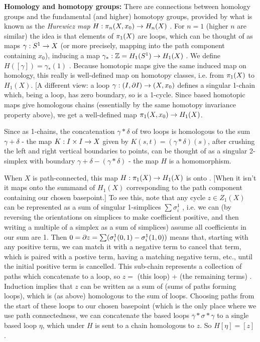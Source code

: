 {\bf Homology and homotopy groups:} There are connections between homology groups and
the fundamental (and higher) homotopy groups, provided by what is known as the
{\it Hurewicz map} $H:\pi_n(X,x_0)\rightarrow H_n(X)$ . For $n=1$ (higher $n$ are similar)
the idea is that elements of $\pi_1(X)$ are loops, which can be thought of as maps
$\gamma:S^1\rightarrow X$ (or more precisely, mapping into the path component containing 
$x_0$), inducing a map $\gamma_*:{\Bbb Z} = H_1(S^1)\rightarrow H_1(X)$ . 
We define $H([\gamma])=\gamma_*(1)$ . Because homotopic maps give the same induced
map on homology, this really is well-defined map on homotopy
classes, i.e. from $\pi_1(X)$ to $H_1(X)$. [A different view: 
a loop $\gamma:(I,\partial I)\rightarrow (X,x_0)$ defines a singular 1-chain which, being a loop,
has zero boundary, so is a 1-cycle. Since based homotopic maps give homologous
chains (essentially by the same homotopy invariance property above), we get a 
well-defined map $\pi_1(X,x_0)\rightarrow H_1(X)$.

Since as 1-chains, the concatenation $\gamma*\delta$ of two loops is homologous
to the sum $\gamma+\delta$ - the map $K:I\times I\rightarrow X$ given by $K(s,t)=(\gamma*\delta)(s)$,
after crushing the left and right vertical boundaries to points, can be thought of as
a singular 2-simplex with boundary $\gamma + \delta - (\gamma*\delta)$ - the map 
$H$ is a homomorphism.

\vfill
\eject

When $X$ is path-connected, this map $H:\pi_1(X)\rightarrow H_1(X)$ is onto . [When it isn't it maps onto the 
summand of $H_1(X)$ corresponding to the path component containing our chosen basepoint.]
To see this, note that any cycle $z\in Z_1(X)$ can be represented as a sum of singular
1-simplices $\sum \sigma_i^1$ , i.e. we can (by reversing the orientations on simplices
to make coefficient positive, and then writing a multiple of a simplex as a sum of
simplices) assume all coefficients in our sum are 1. Then 
$0 = \partial z = \sum (\sigma_i^1(0,1) - \sigma_i^1(1,0))$ means that, starting with any positive term, 
we can match it with a 
negative term to cancel that term, which is paired with a postive term, having a matching negative term, etc.,
until the initial positive term is cancelled. This sub-chain represents a collection of paths which 
concatenate to a loop, so $z=$ (this loop) + (the remaining terms) . Induction implies that
$z$ can be written as a sum of (sums of paths forming loops), which is (as above) homologous  to the
sum of loops. Choosing paths from the start of these loops to our chosen basepoint (which is the only
place where we use path connectedness, we can concatenate the based loops $\overline{\gamma}*\sigma*\gamma$
to a single based loop $\eta$, which under $H$ is sent to a chain homologous to $z$.
So $H[\eta] = [z]$ .

